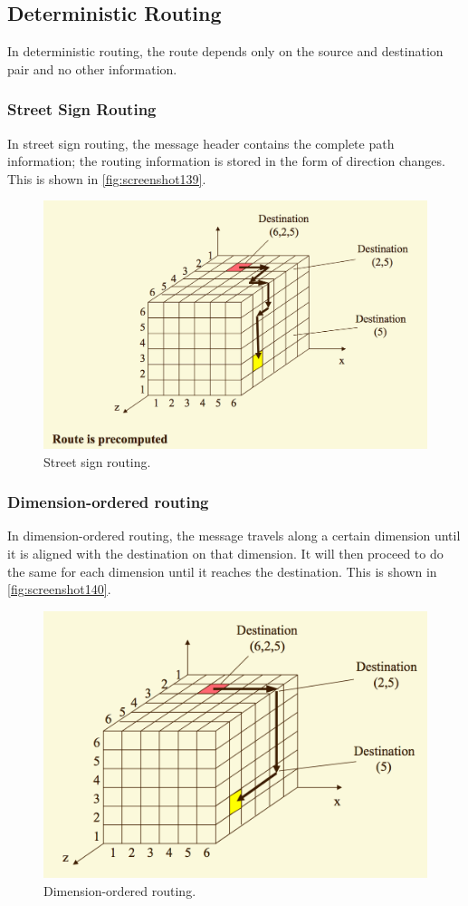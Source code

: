 \subsection{Deterministic Routing}
In deterministic routing, the route depends only on the source and destination pair and no other information.

\subsubsection{Street Sign Routing}
In street sign routing, the message header contains the complete path information; the routing information is stored in the form of direction changes. This is shown in \autoref{fig:screenshot139}.

\begin{figure}
\centering
\includegraphics[width=0.7\linewidth]{screenshot139}
\caption{Street sign routing.}
\label{fig:screenshot139}
\end{figure}

\subsubsection{Dimension-ordered routing}
In dimension-ordered routing, the message travels along a certain dimension until it is aligned with the destination on that dimension. It will then proceed to do the same for each dimension until it reaches the destination. This is shown in \autoref{fig:screenshot140}.

\begin{figure}
\centering
\includegraphics[width=0.7\linewidth]{screenshot140}
\caption{Dimension-ordered routing.}
\label{fig:screenshot140}
\end{figure}

